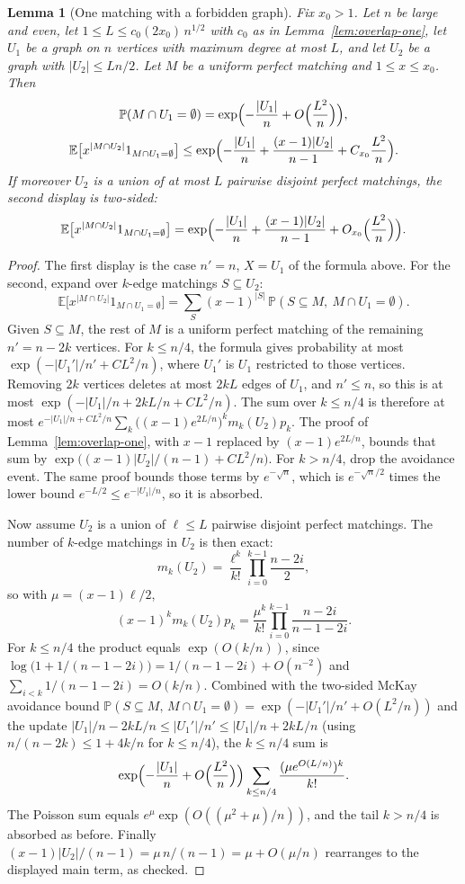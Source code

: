 \documentclass[11pt]{article}
\newtheorem{lemma}[theorem]{Lemma}
\newcommand{\EE}{\mathbb{E}}
\newcommand{\PP}{\mathbb{P}}
\begin{document}
\begin{lemma}[One matching with a forbidden graph]
\label{lem:avoid-overlap}
Fix \(x_0>1\). Let \(n\) be large and even, let \(1\le L\le c_0(2x_0)\,n^{1/2}\)
with \(c_0\) as in Lemma~\ref{lem:overlap-one}, let
\(U_1\) be a graph on \(n\) vertices with maximum degree at most \(L\), and let
\(U_2\) be a graph with \(|U_2|\le Ln/2\).
Let \(M\) be a uniform perfect matching and \(1\le x\le x_0\). Then
\[
\PP(M\cap U_1=\emptyset)=\exp\Bigl(-\frac{|U_1|}{n}+O\Bigl(\frac{L^2}{n}\Bigr)\Bigr),
\]
\[
\EE\bigl[x^{|M\cap U_2|}1_{M\cap U_1=\emptyset}\bigr]
\le
\exp\Bigl(-\frac{|U_1|}{n}+\frac{(x-1)|U_2|}{n-1}+C_{x_0}\frac{L^2}{n}\Bigr).
\]
If moreover \(U_2\) is a union of at most \(L\) pairwise disjoint perfect
matchings, the second display is two-sided:
\[
\EE\bigl[x^{|M\cap U_2|}1_{M\cap U_1=\emptyset}\bigr]
=
\exp\Bigl(-\frac{|U_1|}{n}+\frac{(x-1)|U_2|}{n-1}+O_{x_0}\Bigl(\frac{L^2}{n}\Bigr)\Bigr).
\]
\end{lemma}

\begin{proof}
The first display is the case \(n'=n\), \(X=U_1\) of the formula above.
For the second, expand over \(k\)-edge matchings \(S\subseteq U_2\):
\[
\EE\bigl[x^{|M\cap U_2|}1_{M\cap U_1=\emptyset}\bigr]
=
\sum_{S}(x-1)^{|S|}\,\PP(S\subseteq M,\ M\cap U_1=\emptyset).
\]
Given \(S\subseteq M\), the rest of \(M\) is a uniform perfect matching of the
remaining \(n'=n-2k\) vertices.
For \(k\le n/4\), the formula gives probability at most
\(\exp(-|U_1'|/n'+CL^2/n)\), where \(U_1'\) is \(U_1\) restricted to those
vertices.
Removing \(2k\) vertices deletes at most \(2kL\) edges of \(U_1\), and
\(n'\le n\), so this is at most
\(\exp(-|U_1|/n+2kL/n+CL^2/n)\).
The sum over \(k\le n/4\) is therefore at most
\(e^{-|U_1|/n+CL^2/n}\sum_k\bigl((x-1)e^{2L/n}\bigr)^km_k(U_2)p_k\).
The proof of Lemma~\ref{lem:overlap-one}, with \(x-1\) replaced by
\((x-1)e^{2L/n}\), bounds that sum by
\(\exp\bigl((x-1)|U_2|/(n-1)+CL^2/n\bigr)\).
For \(k>n/4\), drop the avoidance event.
The same proof bounds those terms by \(e^{-\sqrt n}\), which is
\(e^{-\sqrt n/2}\) times the lower bound \(e^{-L/2}\le e^{-|U_1|/n}\), so it is
absorbed.

Now assume \(U_2\) is a union of \(\ell\le L\) pairwise disjoint perfect
matchings. The number of \(k\)-edge matchings in \(U_2\) is then exact:
\[
m_k(U_2)=\frac{\ell^k}{k!}\prod_{i=0}^{k-1}\frac{n-2i}{2},
\]
so with \(\mu=(x-1)\ell/2\),
\[
(x-1)^km_k(U_2)p_k
=
\frac{\mu^k}{k!}
\prod_{i=0}^{k-1}\frac{n-2i}{n-1-2i}.
\]
For \(k\le n/4\) the product equals \(\exp(O(k/n))\), since
\(\log\bigl(1+1/(n-1-2i)\bigr)=1/(n-1-2i)+O(n^{-2})\) and
\(\sum_{i<k}1/(n-1-2i)=O(k/n)\). Combined with the two-sided McKay
avoidance bound
\(\PP(S\subseteq M,\,M\cap U_1=\emptyset)=\exp(-|U_1'|/n'+O(L^2/n))\)
and the update
\(|U_1|/n-2kL/n\le|U_1'|/n'\le|U_1|/n+2kL/n\)
(using \(n/(n-2k)\le1+4k/n\) for \(k\le n/4\)), the \(k\le n/4\) sum is
\[
\exp\Bigl(-\frac{|U_1|}{n}+O\Bigl(\frac{L^2}{n}\Bigr)\Bigr)
\sum_{k\le n/4}\frac{(\mu e^{O(L/n)})^k}{k!}.
\]
The Poisson sum equals \(e^\mu\exp(O((\mu^2+\mu)/n))\), and the tail
\(k>n/4\) is absorbed as before. Finally
\((x-1)|U_2|/(n-1)=\mu\,n/(n-1)=\mu+O(\mu/n)\) rearranges to the displayed
main term, as checked.
\end{proof}
\end{document}
